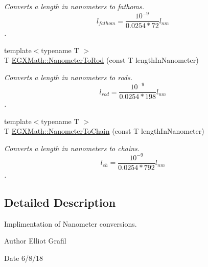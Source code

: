 \begin{DoxyCompactItemize}
\begin{DoxyCompactList}\small\item\em Converts a length in nanometers to fathoms. \[ l_{fathom}= \frac{10^{-9}}{0.0254 * 72} l_{nm} \]. \end{DoxyCompactList}\item 
{\footnotesize template$<$typename T $>$ }\\T \mbox{\hyperlink{group___e_g_x_math-_conversions-_length_conversions-_s_i-_nanometer-_surveyors_ga4677e0e0b8662f3786f43cea2f76e8d9}{E\+G\+X\+Math\+::\+Nanometer\+To\+Rod}} (const T length\+In\+Nanometer)
\begin{DoxyCompactList}\small\item\em Converts a length in nanometers to rods. \[ l_{rod}= \frac{10^{-9}}{0.0254 * 198} l_{nm} \]. \end{DoxyCompactList}\item 
{\footnotesize template$<$typename T $>$ }\\T \mbox{\hyperlink{group___e_g_x_math-_conversions-_length_conversions-_s_i-_nanometer-_surveyors_ga8da91a669cbde463135b21d48ffbdedc}{E\+G\+X\+Math\+::\+Nanometer\+To\+Chain}} (const T length\+In\+Nanometer)
\begin{DoxyCompactList}\small\item\em Converts a length in nanometers to chains. \[ l_{ch}= \frac{10^{-9}}{0.0254 * 792} l_{nm} \]. \end{DoxyCompactList}\end{DoxyCompactItemize}


\subsection{Detailed Description}
Implimentation of Nanometer conversions. 

\begin{DoxyAuthor}{Author}
Elliot Grafil 
\end{DoxyAuthor}
\begin{DoxyDate}{Date}
6/8/18 
\end{DoxyDate}
